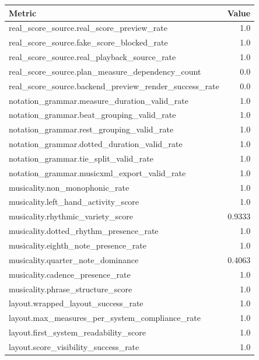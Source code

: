 \begin{tabular}{lr}
Metric & Value \\
\hline
real_score_source.real_score_preview_rate & 1.0 \\
real_score_source.fake_score_blocked_rate & 1.0 \\
real_score_source.real_playback_source_rate & 1.0 \\
real_score_source.plan_measure_dependency_count & 0.0 \\
real_score_source.backend_preview_render_success_rate & 0.0 \\
notation_grammar.measure_duration_valid_rate & 1.0 \\
notation_grammar.beat_grouping_valid_rate & 1.0 \\
notation_grammar.rest_grouping_valid_rate & 1.0 \\
notation_grammar.dotted_duration_valid_rate & 1.0 \\
notation_grammar.tie_split_valid_rate & 1.0 \\
notation_grammar.musicxml_export_valid_rate & 1.0 \\
musicality.non_monophonic_rate & 1.0 \\
musicality.left_hand_activity_score & 1.0 \\
musicality.rhythmic_variety_score & 0.9333 \\
musicality.dotted_rhythm_presence_rate & 1.0 \\
musicality.eighth_note_presence_rate & 1.0 \\
musicality.quarter_note_dominance & 0.4063 \\
musicality.cadence_presence_rate & 1.0 \\
musicality.phrase_structure_score & 1.0 \\
layout.wrapped_layout_success_rate & 1.0 \\
layout.max_measures_per_system_compliance_rate & 1.0 \\
layout.first_system_readability_score & 1.0 \\
layout.score_visibility_success_rate & 1.0 \\
\end{tabular}
